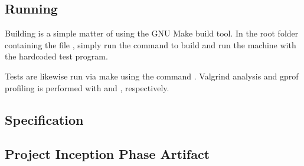 \subsection{Running \thename{}}
\label{sec:appendix:make}

Building \thename{} is a simple matter of using the GNU Make build tool. In the
root folder containing the file , simply run the command
 to build and run the machine with the hardcoded test program.

Tests are likewise run via make using the command . Valgrind
analysis and gprof profiling is performed with  and
, respectively.

\subsection{\thename{} Specification}
\label{sec:appendix:spec}


\subsection{Project Inception Phase Artifact}
\label{appendix:inception-artifact}


